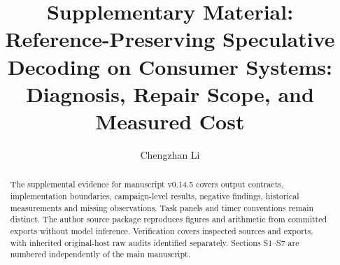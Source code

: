 \documentclass[final,5p,times,twocolumn]{elsarticle}
\begin{document}
\begin{frontmatter}
\title{Supplementary Material: Reference-Preserving Speculative Decoding on Consumer Systems: Diagnosis, Repair Scope, and Measured Cost}
\author{Chengzhan Li}
\address{University of Electronic Science and Technology of China}
\begin{abstract}
The supplemental evidence for manuscript v0.14.5 covers output contracts, implementation boundaries, campaign-level results, negative findings, historical measurements and missing observations. Task panels and timer conventions remain distinct. The author source package reproduces figures and arithmetic from committed exports without model inference. Verification covers inspected sources and exports, with inherited original-host raw audits identified separately. Sections S1--S7 are numbered independently of the main manuscript.
\end{abstract}
\end{frontmatter}
\renewcommand{\thesection}{S\arabic{section}}
\renewcommand{\thetable}{S\arabic{table}}
\renewcommand{\thefigure}{S\arabic{figure}}
\renewcommand{\theequation}{S\arabic{equation}}
\setcounter{tocdepth}{2}
\tableofcontents








\FloatBarrier
\begingroup\small

\endgroup
\end{document}
